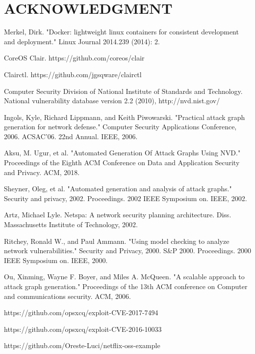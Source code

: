 \documentclass[letterpaper, 10 pt, conference]{ieeeconf}  %
\begin{document}

\section*{ACKNOWLEDGMENT}







\begin{thebibliography}{99}

 Merkel, Dirk. "Docker: lightweight linux containers for consistent development and deployment." Linux Journal 2014.239 (2014): 2.

  CoreOS Clair. https://github.com/coreos/clair

  Clairctl. https://github.com/jgsqware/clairctl

  Computer Security Division of National Institute of Standards and Technology.
National vulnerability database version 2.2 (2010),
http://nvd.nist.gov/

  Ingols, Kyle, Richard Lippmann, and Keith Piwowarski. "Practical attack graph generation for network defense." Computer Security Applications Conference, 2006. ACSAC'06. 22nd Annual. IEEE, 2006.

  Aksu, M. Ugur, et al. "Automated Generation Of Attack Graphs Using NVD." Proceedings of the Eighth ACM Conference on Data and Application Security and Privacy. ACM, 2018.

  Sheyner, Oleg, et al. "Automated generation and analysis of attack graphs." Security and privacy, 2002. Proceedings. 2002 IEEE Symposium on. IEEE, 2002.

  Artz, Michael Lyle. Netspa: A network security planning architecture. Diss. Massachusetts Institute of Technology, 2002.

  Ritchey, Ronald W., and Paul Ammann. "Using model checking to analyze network vulnerabilities." Security and Privacy, 2000. S\&P 2000. Proceedings. 2000 IEEE Symposium on. IEEE, 2000.

  Ou, Xinming, Wayne F. Boyer, and Miles A. McQueen. "A scalable approach to attack graph generation." Proceedings of the 13th ACM conference on Computer and communications security. ACM, 2006.

 https://github.com/opsxcq/exploit-CVE-2017-7494

 https://github.com/opsxcq/exploit-CVE-2016-10033

 https://github.com/Oreste-Luci/netflix-oss-example
\end{thebibliography}
\end{document}
